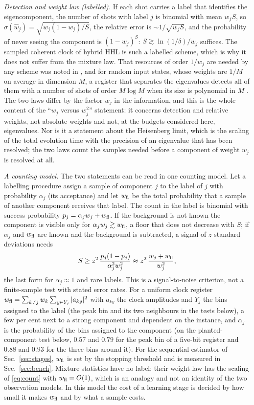 \documentclass[journal]{IEEEtran}
\begin{document}
\emph{Detection and weight law (labelled).} If each shot carries a label that identifies the eigencomponent, the number of shots with label $j$ is binomial with mean $w_jS$, so $\sigma(\hat w_j)=\sqrt{w_j(1-w_j)/S}$, the relative error is $\sim1/\sqrt{w_jS}$, and the probability of never seeing the component is $(1-w_j)^S$: $S\gtrsim\ln(1/\delta)/w_j$ suffices. The sampled coherent clock of hybrid HHL is such a labelled scheme, which is why it does not suffer from the mixture law. That resources of order $1/w_j$ are needed by any scheme was noted in \cite{OBrien2019}, and for random input states, whose weights are $1/M$ on average in dimension $M$, a register that separates the eigenvalues detects all of them with a number of shots of order $M\log M$ when its size is polynomial in $M$ \cite{Izumi2026}. The two laws differ by the factor $w_j$ in the information, and this is the whole content of the ``$w_j$ versus $w_j^2$'' statement: it concerns detection and relative weights, not absolute weights and not, at the budgets considered here, eigenvalues. Nor is it a statement about the Heisenberg limit, which is the scaling of the total evolution time with the precision of an eigenvalue that has been resolved; the two laws count the samples needed before a component of weight $w_j$ is resolved at all.

\emph{A counting model.} The two statements can be read in one counting model. Let a labelling procedure assign a sample of component $j$ to the label of $j$ with probability $\alpha_j$ (its acceptance) and let $w_{\rm fl}$ be the total probability that a sample of another component receives that label. The count in the label is binomial with success probability $p_j=\alpha_jw_j+w_{\rm fl}$. If the background is not known the component is visible only for $\alpha_jw_j\gtrsim w_{\rm fl}$, a floor that does not decrease with $S$; if $\alpha_j$ and $w_{\rm fl}$ are known and the background is subtracted, a signal of $z$ standard deviations needs
\begin{equation}
S\ge z^2\,\frac{p_j(1-p_j)}{\alpha_j^2w_j^2}\approx z^2\,\frac{w_j+w_{\rm fl}}{w_j^2},
\label{eq:count}
\end{equation}
the last form for $\alpha_j\approx1$ and rare labels. This is a signal-to-noise criterion, not a finite-sample test with stated error rates. For a uniform clock register $w_{\rm fl}=\sum_{k\ne j}w_k\sum_{y\in Y_j}|a_{ky}|^2$ with $a_{ky}$ the clock amplitudes and $Y_j$ the bins assigned to the label (the peak bin and its two neighbours in the tests below), a few per cent next to a strong component and dependent on the instance, and $\alpha_j$ is the probability of the bins assigned to the component (on the planted-component test below, $0.57$ and $0.79$ for the peak bin of a five-bit register and $0.88$ and $0.93$ for the three bins around it). For the sequential estimator of Sec.~\ref{sec:stages}, $w_{\rm fl}$ is set by the stopping threshold and is measured in Sec.~\ref{sec:bench}. Mixture statistics have no label; their weight law has the scaling of \eqref{eq:count} with $w_{\rm fl}=O(1)$, which is an analogy and not an identity of the two observation models. In this model the cost of a learning stage is decided by how small it makes $w_{\rm fl}$ and by what a sample costs.
\end{document}
